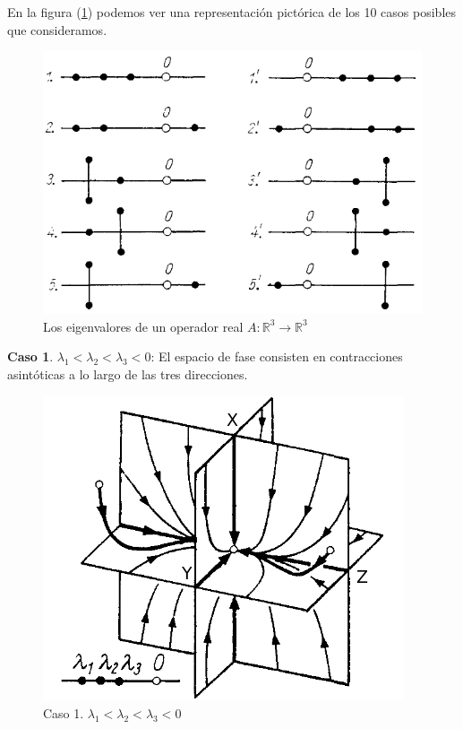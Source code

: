 \documentclass[a4paper,10pt]{article}
\begin{document}
\vspace{.3cm}

En la figura (\ref{fig:problema3fig1}) podemos ver una representación pictórica de los
10 casos posibles que consideramos. 

\begin{figure}[h!]
 \centering
\includegraphics[scale=0.3]{problema3fig1}
\caption{Los eigenvalores de un operador real $A: \mathbb{R}^3 \rightarrow \mathbb{R}^3$}
\label{fig:problema3fig1}
\end{figure}


\textbf{Caso 1}. $\lambda_1 < \lambda_2 < \lambda_3 < 0$: El espacio de fase consisten en contracciones asintóticas
a lo largo de las tres direcciones.

\begin{figure}[h]
 \centering
\includegraphics[scale=0.3]{problema3fig2}
\caption{Caso 1. $\lambda_1 < \lambda_2 < \lambda_3 < 0$}
\label{fig:problema3fig2}
\end{figure}
\vspace{.3cm}
\end{document}
